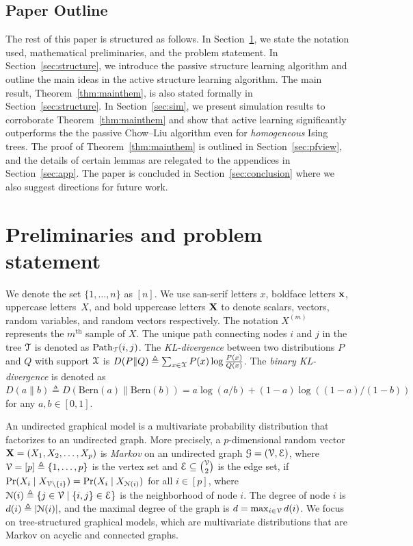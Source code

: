 \subsection{Paper Outline}
The rest of this paper is structured as follows. In Section~\ref{sec:prelim}, we state the notation used, mathematical preliminaries, and the problem statement. In Section~\ref{sec:structure}, we introduce the passive structure learning algorithm  and outline the main ideas in the active structure learning algorithm. The main result, Theorem~\ref{thm:mainthem},  is also stated formally in Section~\ref{sec:structure}.  In Section~\ref{sec:sim}, we present simulation results to corroborate Theorem~\ref{thm:mainthem} and show that active learning significantly outperforms the the passive Chow--Liu algorithm even for {\em homogeneous} Ising trees. The proof of Theorem~\ref{thm:mainthem} is outlined in Section~\ref{sec:pfview}, and the details of certain lemmas are relegated to the appendices in Section~\ref{sec:app}. The paper is concluded in Section~\ref{sec:conclusion} where we also suggest directions for future work. 

\section{Preliminaries and problem statement}\label{sec:prelim}
We denote the set $\{1,\ldots,n\}$ as $[n]$. We use san-serif letters $x$, boldface letters $\mathbf{x}$, uppercase letters~$X$, and bold uppercase letters $\mathbf{X}$ %
to denote scalars, vectors, random 
variables,  and random vectors respectively. 
The notation $X^{(m)}$ represents the $m^{\mathrm{th}}$ sample of $X$. The unique path connecting nodes $i$ and $j$ in the tree $\mathcal{T}$ is denoted as ${\rm Path}_{\mathcal{T}}(i,j)$. The {\em KL-divergence}   between two distributions $P$ and $Q$ with support $\mathcal{X}$ is 
$D(P\|Q)\triangleq\sum_{x\in\mathcal{X}}P(x)\log\frac{P(x)}{Q(x)}$. 
The {\em binary KL-divergence}  is denoted as  $D(a\|b)\triangleq D(\mathrm{Bern}(a) \| \mathrm{Bern}(b)) = a\log (a/b)+(1-a)\log( (1-a)/(1-b))$ for any $a,b\in [0,1]$. %

An undirected graphical model is a multivariate probability distribution that factorizes to an undirected graph\cite{lauritzen1996graphical}. More precisely, a $p$-dimensional random vector $\mathbf{X}=(X_{1},X_{2},\ldots,X_{p})$ is \emph{Markov} on an undirected graph $\mathcal{G}=(\mathcal{V},\mathcal{E})$, where $\mathcal{V}=[p]\triangleq\{1,\ldots,p\}$ is the vertex set and $\mathcal{E}\subseteq\tbinom{\mathcal{V}}{2}$ is the edge set, if $\Pr(X_{i} \mid X_{\mathcal{V}\backslash \{i\}})=\Pr(X_{i} \mid X_{\mathcal{N}(i)})$ for all $i\in[p]$, where $\mathcal{N}(i)\triangleq\{j\in\mathcal{V} \mid \{i,j\}\in\mathcal{E}\}$ is the neighborhood of node $i$. The degree of  node $i$ is $d (i)\triangleq |\mathcal{N}(i)|$, and the maximal degree of the graph is $d=\max_{i\in\mathcal{V}} d (i)$. We focus on   tree-structured graphical models, which are   multivariate distributions that are Markov on  acyclic and connected  graphs.
